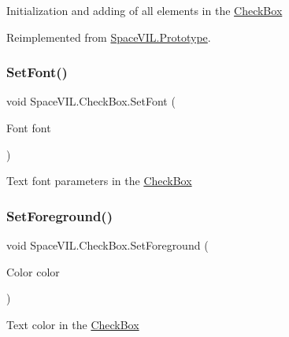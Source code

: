 Initialization and adding of all elements in the \mbox{\hyperlink{class_space_v_i_l_1_1_check_box}{Check\+Box}} 



Reimplemented from \mbox{\hyperlink{class_space_v_i_l_1_1_prototype_ac3379fe02923ee155b5b0084abf27420}{Space\+V\+I\+L.\+Prototype}}.

\mbox{\label{class_space_v_i_l_1_1_check_box_aa2c476ef3b72afc85fa42a685df7535e}} 
\subsubsection{\texorpdfstring{Set\+Font()}{SetFont()}}
{\footnotesize\ttfamily void Space\+V\+I\+L.\+Check\+Box.\+Set\+Font (\begin{DoxyParamCaption}\item[{Font}]{font }\end{DoxyParamCaption})\hspace{0.3cm}{\ttfamily [inline]}}



Text font parameters in the \mbox{\hyperlink{class_space_v_i_l_1_1_check_box}{Check\+Box}} 

\mbox{\label{class_space_v_i_l_1_1_check_box_a67374114323c8079e8c8cf70738556f9}} 
\subsubsection{\texorpdfstring{Set\+Foreground()}{SetForeground()}}
{\footnotesize\ttfamily void Space\+V\+I\+L.\+Check\+Box.\+Set\+Foreground (\begin{DoxyParamCaption}\item[{Color}]{color }\end{DoxyParamCaption})\hspace{0.3cm}{\ttfamily [inline]}}



Text color in the \mbox{\hyperlink{class_space_v_i_l_1_1_check_box}{Check\+Box}} 

